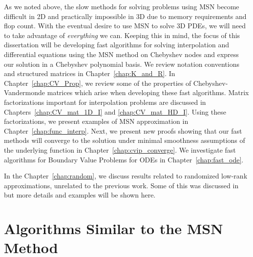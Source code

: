 As we noted above, the slow methods for solving problems using
MSN become difficult in 2D and practically impossible in 3D
due to memory requirements and flop count. With the eventual
desire to use MSN to solve 3D PDEs,
we will need to take advantage of \emph{everything} we can.
Keeping this in mind, the focus of this dissertation
will be developing fast algorithms for solving interpolation
and differential equations using the MSN method on Chebyshev nodes
and express our solution in a Chebyshev polynomial basis.
We review notation conventions and structured
matrices in Chapter~\ref{chap:K_and_R}.
In Chapter~\ref{chap:CV_Prop}, we review some of the properties
of Chebyshev-Vandermonde matrices which arise when developing
these fast algorithms.
Matrix factorizations important for interpolation problems are
discussed in Chapters~\ref{chap:CV_mat_1D_I} and \ref{chap:CV_mat_HD_I}.
Using these factorizations, we present examples of MSN approximation
in Chapter~\ref{chap:func_interp}.
Next, we present new proofs showing that our fast methods
will converge to the solution under minimal smoothness assumptions
of the underlying function in Chapter~\ref{chap:cvip_converge}.
We investigate fast algorithms for Boundary Value Problems for ODEs
in Chapter~\ref{chap:fast_ode}.

In the Chapter~\ref{chap:random}, we discuss results related
to randomized low-rank approximations, unrelated to the previous work.
Some of this was discussed in~\cite{randomHSSLBL}
but more details and examples will be shown here.



\section{Algorithms Similar to the MSN Method}
\label{sec:similar_methods}

